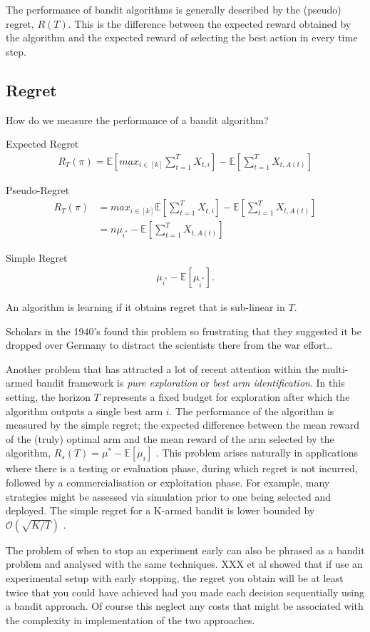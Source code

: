 \documentclass[11pt,a4paper,oneside]{book}
\newcommand{\simpleregret}{R_T}
\newcommand{\E}[1]{\mathbb E\left[{#1}\right]}
\newcommand{\eqn}[1]{\begin{align}#1\end{align}}
\newcommand{\bigo}[1]{\mathcal{O}\left( #1 \right)}
\theoremstyle{plain}
\theoremstyle{definition}
\begin{document}
The performance of bandit algorithms is generally described by the (pseudo) regret, $R(T)$. This is the difference between the expected reward obtained by the algorithm and the expected reward of selecting the best action in every time step. 

\subsection{Regret} How do we measure the performance of a bandit algorithm?


Expected Regret
\eqn{
R_T(\pi) = \E{max_{i \in [k]} \sum_{t=1}^T{X_{t,i}}} - \E{\sum_{t=1}^T{X_{t,A(t)}}}
}

Pseudo-Regret
\eqn{
R_T(\pi) &= max_{i \in [k]}\E{\sum_{t=1}^T{X_{t,i}}} - \E{\sum_{t=1}^T{X_{t,A(t)}}} \\
&= n\mu_{i^*} - \E{\sum_{t=1}^T{X_{t,A(t)}}}
}

Simple Regret
\eqn{
\mu_{i^*} - \E{\mu_{\hat i^*}}.
}


An algorithm is learning if it obtains regret that is sub-linear in $T$. 

Scholars in the 1940's found this problem so frustrating that they suggested it be dropped over Germany to distract the scientists there from the war effort.\cite{XXX}. 


Another problem that has attracted a lot of recent attention \cite{Bubeck2009,Audibert2010,Gabillon2012,Karnin2013} within the multi-armed bandit framework is \textit{pure exploration} or \textit{best arm identification}. In this setting, the horizon $T$ represents a fixed budget for exploration after which the algorithm outputs a single best arm $i$. The performance of the algorithm is measured by the simple regret; the expected difference between the mean reward of the (truly) optimal arm and the mean reward of the arm selected by the algorithm, $R_s(T) = \mu^* - \E{\mu_i}$ . This problem arises naturally in applications where there is a testing or evaluation phase, during which regret is not incurred, followed by a commercialisation or exploitation phase. For example, many strategies might be assessed via simulation prior to one being selected and deployed. The simple regret for a K-armed bandit is lower bounded by $\bigo{\sqrt{K/T}}$ \cite{Bubeck2009}.

The problem of when to stop an experiment early can also be phrased as a bandit problem and analysed with the same techniques. XXX et al showed that if use an experimental setup with early stopping, the regret you obtain will be at least twice that you could have achieved had you made each decision sequentially using a bandit approach. Of course this neglect any costs that might be associated with the complexity in implementation of the two approaches. 
\end{document}
